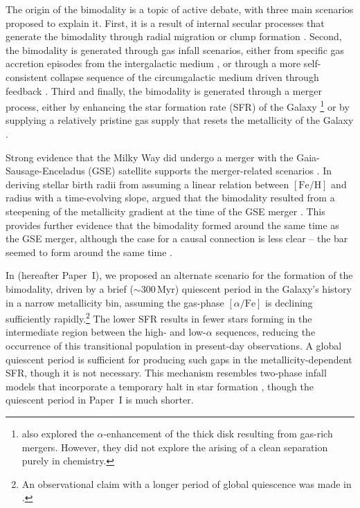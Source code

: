 \documentclass[twocolumn]{aastex631}
\newcommand{\Myr}{\ensuremath{\textrm{Myr}}}
\newcommand{\FeH}{\ensuremath{[\textrm{Fe}/\textrm{H}]}}
\newcommand{\alphaFe}{\ensuremath{[\alpha/\textrm{Fe}]}}
\begin{document}
The origin of the bimodality is a topic of active debate, with three main scenarios proposed to explain it. First, it is a result of internal secular processes that generate the bimodality through radial migration \citep{2009MNRAS.396..203S,2021MNRAS.507.5882S,2023MNRAS.523.3791C} or clump formation \citep{2019MNRAS.484.3476C,2020MNRAS.492.4716B,2021MNRAS.502..260B,2023ApJ...953..128G}. Second, the bimodality is generated through gas infall scenarios, either from specific gas accretion episodes from the intergalactic medium \citep{1997ApJ...477..765C,2009IAUS..254..191C,2017MNRAS.472.3637G,2019A&A...623A..60S}, or through a more self-consistent collapse sequence of the circumgalactic medium driven through feedback \citep{2021MNRAS.501.5176K}. Third and finally, the bimodality is generated through a merger process, either by enhancing the star formation rate (SFR) of the Galaxy \citep{2018MNRAS.474.3629G}\footnote{\citet{2004ApJ...612..894B,2005ApJ...630..298B,2007ApJ...658...60B,2010MNRAS.402.1489R} also explored the $\alpha$-enhancement of the thick disk resulting from gas-rich mergers. However, they did not explore the arising of a clean separation purely in chemistry.} or by supplying a relatively pristine gas supply that resets the metallicity of the Galaxy \citep{2020MNRAS.491.5435B,2024MNRAS.528L.122C}.

Strong evidence that the Milky Way did undergo a merger with the Gaia-Sausage-Enceladus (GSE) satellite supports the merger-related scenarios \citep{2018MNRAS.478..611B,2018Natur.563...85H,2020ApJ...901...48N,2024ApJ...972..112C}. In deriving stellar birth radii from assuming a linear relation between \FeH{} and radius with a time-evolving slope, \citet{2024MNRAS.535..392L} argued that the bimodality resulted from a steepening of the metallicity gradient at the time of the GSE merger \citep[see also][]{2023MNRAS.525.2208R}. This provides further evidence that the bimodality formed around the same time as the GSE merger, although the case for a causal connection is less clear -- the bar seemed to form around the same time \citep[e.g][]{2019MNRAS.490.4740B,2024MNRAS.530.2972S}.

In \citet{2024arXiv240707985B} (hereafter Paper~I), we proposed an alternate scenario for the formation of the bimodality, driven by a brief ($\sim300\,\Myr$) quiescent period in the Galaxy's history in a narrow metallicity bin, assuming the gas-phase \alphaFe{} is declining sufficiently rapidly.\footnote{An observational claim with a longer period of global quiescence was made in \citet{2016A&A...589A..66H}.} The lower SFR results in fewer stars forming in the intermediate region between the high- and low-$\alpha$ sequences, reducing the occurrence of this transitional population in present-day observations. A global quiescent period is sufficient for producing such gaps in the metallicity-dependent SFR, though it is not necessary. This mechanism resembles two-phase infall models that incorporate a temporary halt in star formation \citep[][and references therein]{2024arXiv240511025S}, though the quiescent period in Paper~I is much shorter.
\end{document}

